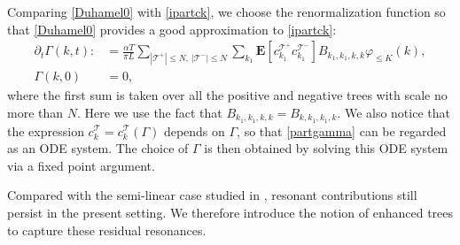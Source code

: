 \documentclass[UTF-8,reqno]{amsart}
\numberwithin{equation}{section}
\theoremstyle{definition}
\def\leq{\leqslant}
\def\leq{\leqslant}
\begin{document}
Comparing \eqref{Duhamel0} with \eqref{ipartck}, we choose the renormalization function so that \eqref{Duhamel0} provides a good approximation to \eqref{ipartck}:
\begin{align}
    \partial_t\Gamma(k,t):&=\frac{\alpha T}{\pi L}\sum_{ |\mathcal{T}^+|\leq N,\ |\mathcal{T}^-|\leq N }\sum_{k_1}\mathbf{E}[c^{\mathcal{T}^+}_{k_1} {c^{\mathcal{T}^-}_{k_1}} ] B_{k_1,k_1,k,k}\varphi_{\leq K}(k),\label{partgamma}\\
    \Gamma(k,0)&=0,
\end{align}
where the first sum is taken over all the positive and negative trees with scale no more than $N$. 
Here we use the fact that $B_{k_1,k_1,k,k}=B_{k,k_1,k_1,k}$. We also notice that the expression $c_k^{\mathcal{T}} = c_k^{\mathcal{T}}(\Gamma)$ depends on $\Gamma$, so that \eqref{partgamma} can be regarded as an ODE system. The choice of $\Gamma$ is then obtained by solving this ODE system via a fixed point argument.  

Compared with the semi-linear case studied in \cite{DH21,DH23a,Vas24}, resonant contributions still persist in the present setting. We therefore introduce the notion of enhanced trees to  capture these residual resonances.
\end{document}
